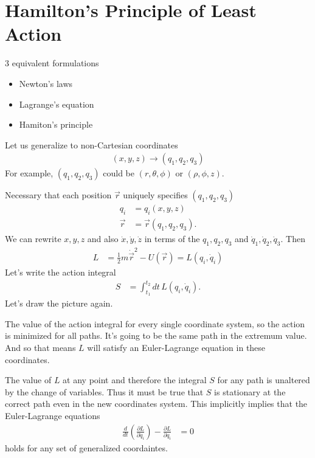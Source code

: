 \section{Hamilton's Principle of Least Action}
3 equivalent formulations
\begin{itemize}
    \item Newton's laws
    \item Lagrange's equation
    \item Hamiton's principle
\end{itemize}
Let us generalize to non-Cartesian coordinates
\begin{align}
    \left( x, y, z \right) \to \left( q_1, q_2, q_3 \right)
\end{align}
For example, $(q_1, q_2, q_3)$
could be
$(r, \theta, \phi)$
or
$(\rho, \phi, z)$.

Necessary that each position $\vec{r}$
uniquely specifies $(q_1, q_2, q_3)$
\begin{align}
    q_i &= q_i(x, y, z)\\
    \vec{r} &= \vec{r}\left( q_1, q_2, q_3 \right).
\end{align}
We can rewrite $x,y,z$
and also
$\dot{x},\dot{y},\dot{z}$
in terms of the
$q_1,q_2,q_3$
and
$\dot{q}_1,\dot{q}_2,\dot{q}_3$.
Then
\begin{align}
    L &=
    \frac{1}{2}m\dot{\vec{r}}^2 - U(\vec{r})
    = L(q_i, \dot{q}_i)
\end{align}
Let's write the action integral
\begin{align}
    S &=
    \int_{t_1}^{t_2} dt\,
    L\left( q_i, \dot{q}_i \right).
\end{align}
Let's draw the picture again.

The value of the action integral for every single coordinate system,
so the action is minimized for all paths.
It's going to be the same path in the extremum value.
And so that means $L$ will satisfy an Euler-Lagrange equation in these
coordinates.

The value of $L$ at any point and therefore the integral $S$ for any path is
unaltered by the change of variables.
Thus it must be true that $S$ is stationary at the correct path even in the new
coordinates system.
This implicitly implies that the Euler-Lagrange equations
\begin{align}
    \frac{d}{dt}\left( \frac{\partial L}{\partial \dot{q}_i} \right)
    - \frac{\partial L}{\partial q_i} &= 0
\end{align}
holds for any set of generalized coordaintes.

